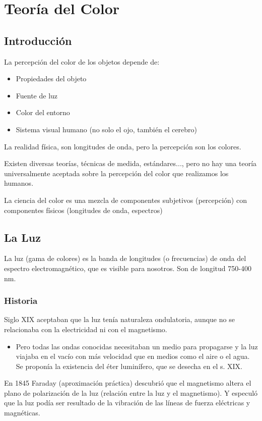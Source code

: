 \chapter{Teoría del Color}
\section{Introducción}
La percepción del color de los objetos depende de:
\begin{itemize}
    \item Propiedades del objeto
    \item Fuente de luz
    \item Color del entorno
    \item Sistema visual humano (no solo el ojo, también el cerebro)
\end{itemize}

La realidad física, son longitudes de onda, pero la percepción son los colores.

Existen diversas teorías, técnicas de medida, estándares..., pero no hay una teoría universalmente aceptada sobre la percepción del color que realizamos los humanos.

La ciencia del color es una mezcla de componentes subjetivos (percepción) con componentes físicos (longitudes de onda, espectros)

\section{La Luz}
La luz (gama de colores) es la banda de longitudes (o frecuencias) de onda del espectro electromagnético, que es visible para nosotros. Son de longitud 750-400 nm.

\subsection{Historia}
Siglo XIX aceptaban que la luz tenía naturaleza ondulatoria, aunque no se relacionaba con la electricidad ni con el magnetismo.
\begin{itemize}
    \item Pero todas las ondas conocidas necesitaban un medio para propagarse y la luz viajaba en el vacío con más velocidad que en medios como el aire o el agua. Se proponía la existencia del éter luminífero, que se desecha en el s. XIX.
\end{itemize}

En 1845 Faraday (aproximación práctica) descubrió que el magnetismo altera el plano de polarización de la luz (relación entre la luz y el magnetismo). Y especuló que la luz podía ser resultado de la vibración de las líneas de fuerza eléctricas y magnéticas. 
\pagebreak

